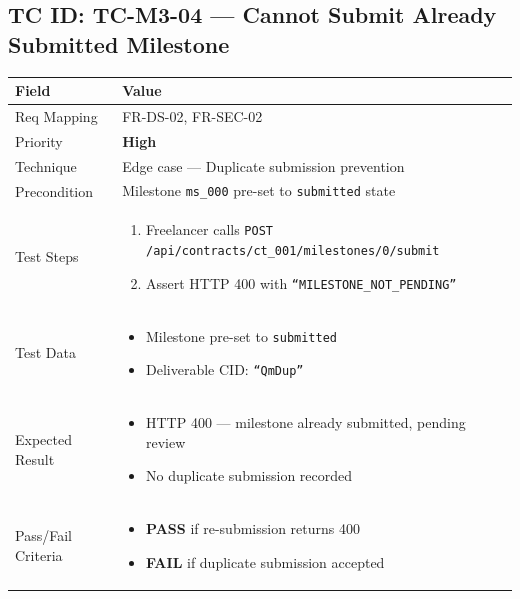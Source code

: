\documentclass[12pt,a4paper]{article}
\newcommand{\sevhigh}{\textcolor{severityhigh}{\textbf{High}}}
\newcommand{\passresult}{\textcolor{passgreen}{\textbf{PASS}}}
\newcommand{\failresult}{\textcolor{failred}{\textbf{FAIL}}}
\begin{document}
\vspace{0.8cm}

\subsection{TC ID: TC-M3-04 --- Cannot Submit Already Submitted Milestone}

\begin{tabular}{|p{}|p{}|}
\hline
\rowcolor{lightblue} \textbf{Field} & \textbf{Value} \\
\hline
Req Mapping & FR-DS-02, FR-SEC-02 \\
\hline
Priority & \sevhigh \\
\hline
Technique & Edge case --- Duplicate submission prevention \\
\hline
Precondition & Milestone \texttt{ms\_000} pre-set to \texttt{submitted} state \\
\hline
Test Steps &
\begin{enumerate}[nosep, leftmargin=*]
  \item Freelancer calls \texttt{POST /api/contracts/ct\_001/milestones/0/submit}
  \item Assert HTTP 400 with \texttt{``MILESTONE\_NOT\_PENDING''}
\end{enumerate} \\
\hline
Test Data &
\begin{itemize}[nosep, leftmargin=*]
  \item Milestone pre-set to \texttt{submitted}
  \item Deliverable CID: \texttt{``QmDup''}
\end{itemize} \\
\hline
Expected Result &
\begin{itemize}[nosep, leftmargin=*]
  \item HTTP 400 --- milestone already submitted, pending review
  \item No duplicate submission recorded
\end{itemize} \\
\hline
Pass/Fail Criteria &
\begin{itemize}[nosep, leftmargin=*]
  \item \passresult{} if re-submission returns 400
  \item \failresult{} if duplicate submission accepted
\end{itemize} \\
\hline
\end{tabular}
\end{document}
